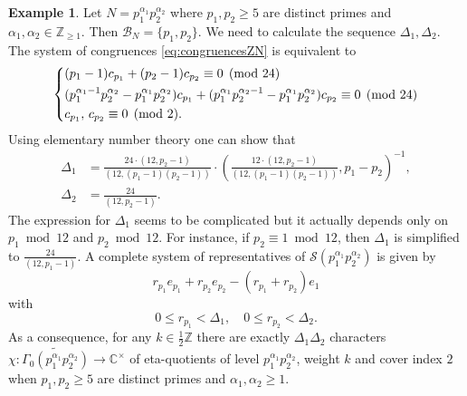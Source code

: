 \documentclass[12pt]{amsart}
\numberwithin{equation}{section}
\theoremstyle{plain}
\theoremstyle{definition}
\newtheorem{examp}[thm]{Example}
\theoremstyle{remark}
\newcommand\numZ{\mathbb{Z}}
\newcommand\numC{\mathbb{C}}
\newcommand\numgeq[2]{\mathbb{#1}_{\geq #2}}
\begin{document}
\begin{examp}
\label{examp:classifyChar5}
Let $N=p_1^{\alpha_1}p_2^{\alpha_2}$ where $p_1,p_2\geq5$ are distinct primes and $\alpha_1,\alpha_2\in\numgeq{Z}{1}$. Then $\mathscr{B}_N=\{p_1,p_2\}$. We need to calculate the sequence $\Delta_1,\Delta_2$. The system of congruences \eqref{eq:congruencesZN} is equivalent to
\begin{equation*}
\begin{dcases}
(p_1-1)c_{p_1}+(p_2-1)c_{p_2}\equiv0\pmod{24}\\
(p_1^{\alpha_1-1}p_2^{\alpha_2}-p_1^{\alpha_1}p_2^{\alpha_2})c_{p_1}+(p_1^{\alpha_1}p_2^{\alpha_2-1}-p_1^{\alpha_1}p_2^{\alpha_2})c_{p_2}\equiv0\pmod{24}\\
c_{p_1},\,c_{p_2}\equiv0\pmod{2}.
\end{dcases}
\end{equation*}
Using elementary number theory one can show that
\begin{align*}
\Delta_1&=\frac{24\cdot(12,p_2-1)}{(12,(p_1-1)(p_2-1))}\cdot\left(\frac{12\cdot(12,p_2-1)}{(12,(p_1-1)(p_2-1))},p_1-p_2\right)^{-1},\\
\Delta_2&=\frac{24}{(12,p_2-1)}.
\end{align*}
The expression for $\Delta_1$ seems to be complicated but it actually depends only on $p_1\bmod{12}$ and $p_2\bmod{12}$. For instance, if $p_2\equiv1\bmod{12}$, then $\Delta_1$ is simplified to $\frac{24}{(12,p_1-1)}$. A complete system of representatives of $\mathscr{S}(p_1^{\alpha_1}p_2^{\alpha_2})$ is given by
\begin{equation*}
r_{p_1}e_{p_1}+r_{p_2}e_{p_2}-(r_{p_1}+r_{p_2})e_1
\end{equation*}
with
\begin{equation*}
0\leq r_{p_1}<\Delta_1,\quad 0\leq r_{p_2}<\Delta_2.
\end{equation*}
As a consequence, for any $k\in\frac{1}{2}\numZ$ there are exactly $\Delta_1\Delta_2$ characters $\chi\colon\widetilde{\Gamma_0(p_1^{\alpha_1}p_2^{\alpha_2})}\to\numC^\times$ of eta-quotients of level $p_1^{\alpha_1}p_2^{\alpha_2}$, weight $k$ and cover index $2$ when $p_1, p_2\geq5$ are distinct primes and $\alpha_1,\alpha_2\geq1$.
\end{examp}
\end{document}
